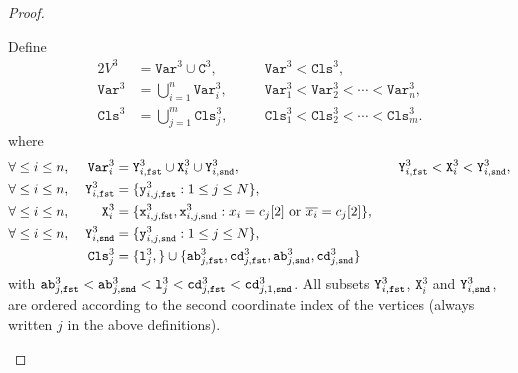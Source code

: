 \begin{proof}
  \begin{mdframed}
    Define
    \begin{alignat*}{2}
      V^{3} &= \texttt{Var}^{3} \cup \texttt{C}^{3},
      &\quad&\text{$\texttt{Var}^{3} < \texttt{Cls}^{3}$,}
      \\
      \texttt{Var}^{3} &= \bigcup_{i=1}^{n} \texttt{Var}^{3}_{i},
      &&\text{$\texttt{Var}^{3}_1 < \texttt{Var}^{3}_2 < \cdots < \texttt{Var}^{3}_n$,}
      \\
      \texttt{Cls}^{3} &= \bigcup_{j=1}^{m} \texttt{Cls}^{3}_{j},
      &&\text{$\texttt{Cls}^{3}_1 < \texttt{Cls}^{3}_2 < \cdots < \texttt{Cls}^{3}_m$.}
    \end{alignat*}
    where
    \begin{alignat*}{3}
      &\forall \leq i \leq n,\;&
      \texttt{Var}^{3}_{i} &= \texttt{Y}^{3}_{i,\texttt{fst}} \cup \texttt{X}^{3}_{i} \cup \texttt{Y}^{3}_{i,\texttt{snd}},
      &\quad&\text{$\texttt{Y}^{3}_{i,\texttt{fst}} < \texttt{X}^{3}_{i} < \texttt{Y}^{3}_{i,\texttt{snd}}$},
      \\
      &\forall \leq i \leq n,\;&
      \texttt{Y}^{3}_{i,\texttt{fst}}
      &=
      \{\texttt{y}^{3}_{i,j,\texttt{fst}} : 1 \leq j \leq N\},
      &&
      \\
      &\forall \leq i \leq n,\;&
      \texttt{X}^{3}_{i}
      &=
      \{\texttt{x}^{3}_{i,j,\text{fst}}, \texttt{x}^{3}_{i,j,\text{snd}} :
      \text{$x_{i} = c_{j}[2]$ or $\overline{x_{i}} = c_{j}[2]$}\},
      &&
      \\
      &\forall \leq i \leq n,\;&
      \texttt{Y}^{3}_{i,\texttt{snd}}
      &=
      \{\texttt{y}^{3}_{i,j,\texttt{snd}} : 1 \leq j \leq N\},
      &&
      \\
      &&\texttt{Cls}^{3}_{j}
      &=
      \{
      \texttt{l}^{3}_{j},
      \}
      \cup
      \{
      \texttt{ab}^{3}_{j,\texttt{fst}},
      \texttt{cd}^{3}_{j,\texttt{fst}},
      \texttt{ab}^{3}_{j,\texttt{snd}},
      \texttt{cd}^{3}_{j,\texttt{snd}}
      \}
      &&
    \end{alignat*}
    with
    $
    \texttt{ab}^{3}_{j,\texttt{fst}} <
    \texttt{ab}^{3}_{j,\texttt{snd}} <
    \texttt{l}^{3}_{j} <
    \texttt{cd}^{3}_{j,\texttt{fst}} <
    \texttt{cd}^{3}_{j,1,\texttt{snd}}
    $.
    All subsets
    $\texttt{Y}^{3}_{i,\texttt{fst}}$, $\texttt{X}^{3}_{i}$ and $\texttt{Y}^{3}_{i,\texttt{snd}}$,
    are ordered according to the second coordinate index of the vertices
    (always written $j$ in the above definitions).


\end{mdframed}
\end{proof}
